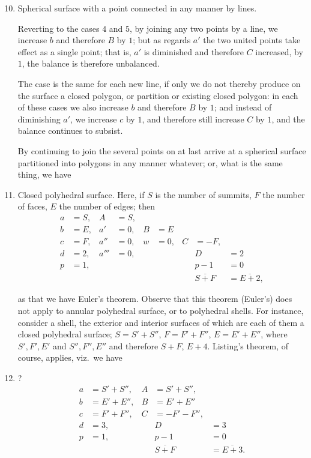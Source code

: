 \documentclass[11pt,a4paper]{book}
\begin{document}
\begin{enumerate}
\setcounter{enumi}{9}
\item Spherical surface with a point connected in any manner by lines.

Reverting to the cases $4$ and $5$, by joining any two points by a line, we increase $b$
and therefore $B$ by $1$; but as regards $a'$ the two united points take effect as a
single point; that is, $a'$ is diminished and therefore $C$ increased, by $1$, the balance
is therefore unbalanced.

The case is the same for each new line, if only we do not thereby produce on
the surface a closed polygon, or partition or existing closed polygon: in each of these
cases we also increase $b$ and therefore $B$ by $1$; and instead of diminishing $a'$, we
increase $c$ by $1$, and therefore still increase $C$ by $1$, and the balance continues to
subsist.

By continuing to join the several points on at last arrive at a spherical surface
partitioned into polygons in any manner whatever; or, what is the same thing,
we have

\item Closed polyhedral surface. Here, if $S$ is the number of summits, $F$ the
number of faces, $E$ the number of edges; then
\begin{align*}
a &= S, & A &= S, \\
b &= E, & a' &= 0, & B &= E \\
c &= F, & a'' &= 0, & w &= 0, & C &= -F, \\
d &= 2, & a''' &= 0, & & & & D &= 2 \\
p &= 1, & & & & & & p - 1 &= 0 \\[2pt]
& & & & & & & \overline{S + F} &= \overline{E + 2},
\end{align*}

as that we have Euler's theorem. Observe that this theorem (Euler's) does not apply
to annular polyhedral surface, or to polyhedral shells. For instance, consider a shell,
the exterior and interior surfaces of which are each of them a closed polyhedral
surface; $S = S' + S''$, $F = F' + F''$, $E = E' + E''$, where $S', F', E'$ and $S'', F'', E''$
and therefore $S + F$, $E + 4$. Listing's theorem, of course, applies, viz.\ we have

\item ?
\begin{align*}
a &= S' + S'', & A &= S' + S'', \\
b &= E' + E'', & B &= E' + E'' \\
c &= F' + F'', & C &= -F' - F'', \\
d &= 3, & & D &= 3 \\
p &= 1, & & p - 1 &= 0 \\[2pt]
& & & \overline{S + F} &= \overline{E + 3}.
\end{align*}
\end{enumerate}
\end{document}
